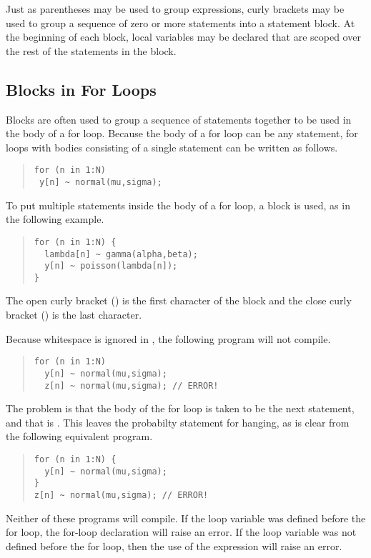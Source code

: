 Just as parentheses may be used to group expressions, curly brackets
may be used to group a sequence of zero or more statements into a
statement block.  At the beginning of each block, local variables may be
declared that are scoped over the rest of the statements in the block.

\subsection{Blocks in For Loops}

Blocks are often used to group a sequence of statements together to be
used in the body of a for loop.  Because the body of a for loop can be
any statement, for loops with bodies consisting of a single statement
can be written as follows.
%
\begin{quote}
\begin{Verbatim} 
for (n in 1:N) 
 y[n] ~ normal(mu,sigma);
\end{Verbatim}
\end{quote}
% 
To put multiple statements inside the body of a for loop, a block is
used, as in the following example.
%
\begin{quote}
\begin{Verbatim}
for (n in 1:N) {
  lambda[n] ~ gamma(alpha,beta);
  y[n] ~ poisson(lambda[n]);
}
\end{Verbatim}
\end{quote}
%
The open curly bracket (\code{\{}) is the first character of the block
and the close curly bracket (\code{\}}) is the last character.

Because whitespace is ignored in \Stan, the following program will
not compile.
%
\begin{quote}
\begin{Verbatim}
for (n in 1:N) 
  y[n] ~ normal(mu,sigma);
  z[n] ~ normal(mu,sigma); // ERROR!
\end{Verbatim}
\end{quote}
%
The problem is that the body of the for loop is taken to be the next
statement, and that is .  This leaves
the probabilty statement for  hanging, as is clear from
the following equivalent program.
%
\begin{quote}
\begin{Verbatim}
for (n in 1:N) {
  y[n] ~ normal(mu,sigma);
}
z[n] ~ normal(mu,sigma); // ERROR!
\end{Verbatim}
\end{quote}
%
Neither of these programs will compile. If the loop variable 
was defined before the for loop, the for-loop declaration will raise
an error.  If the loop variable  was not defined before the
for loop, then the use of the expression  will raise an
error. 

